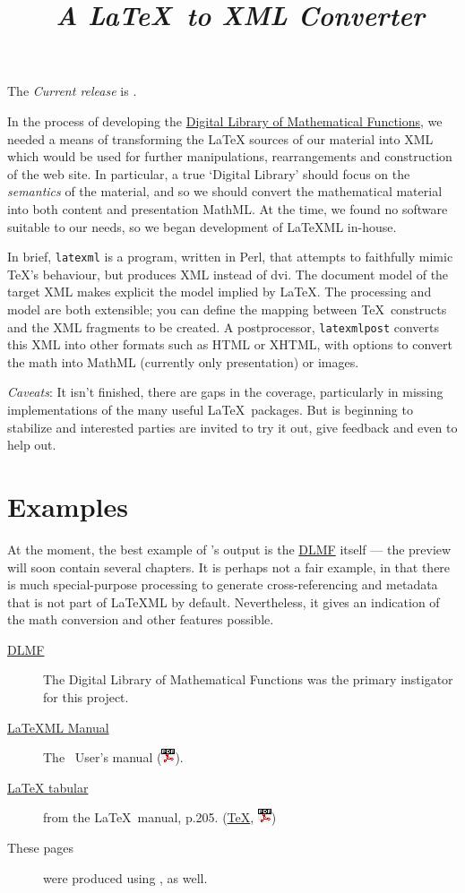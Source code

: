 \documentclass{article}
\title{\LaTeXML\ \emph{A \LaTeX\ to XML Converter}}
\newcommand{\PDFIcon}{\includegraphics{pdf}}
\begin{document}
\maketitle

The \emph{Current release} is .

In the process of developing the
\href{http://dlmf.nist.gov/}{Digital Library of Mathematical Functions},
we needed a means of transforming
the LaTeX sources of our material into XML which would be used
for further manipulations, rearrangements and construction of the web site.
In particular, a true `Digital Library' should focus on the \emph{semantics}
of the material, and so we should convert the mathematical material into both
content and presentation MathML.
At the time, we found no software suitable to our needs, so we began
development of LaTeXML in-house.  

In brief, \texttt{latexml} is a program, written in Perl, that attempts to
faithfully mimic \TeX's behaviour, but produces XML instead of dvi.
The document model of the target XML makes explicit the model implied
by \LaTeX.
The processing and model are both extensible; you can define
the mapping between \TeX\ constructs and the XML fragments to be created.
A postprocessor, \texttt{latexmlpost} converts this
XML into other formats such as HTML or XHTML, with options
to convert the math into MathML (currently only presentation) or images.

\emph{Caveats}: It isn't finished, there are gaps in the coverage,
particularly in missing implementations of the many useful \LaTeX\ packages.
But is beginning to stabilize and interested parties
are invited to try it out, give feedback and even to help out.


\section{Examples}\label{examples}
At the moment, the best example of \LaTeXML's output is 
the \href{http://dlmf.nist.gov/}{DLMF} itself
--- the preview  will soon contain several chapters.
It is perhaps not a fair example, in that there is much
special-purpose processing to generate cross-referencing and metadata that is not
part of LaTeXML by default. Nevertheless, it gives an indication of the
math conversion and other features possible.

\begin{description}
\item[\href{http://dlmf.nist.gov/}{DLMF}]
   The Digital Library of Mathematical Functions was the
   primary instigator for this project.
\item[\href{manual/}{LaTeXML Manual}]
   The \LaTeXML\ User's manual (\href{manual.pdf}{\PDFIcon}).
\item[\href{examples/tabular/tabular.html}{LaTeX tabular}]
    from the \LaTeX\ manual, p.205.
    (\href{examples/tabular/tabular.tex}{\TeX},
     \href{examples/tabular/tabular.pdf}{\PDFIcon})
\item[These pages] were produced using \LaTeXML, as well.
\end{description}
\end{document}
